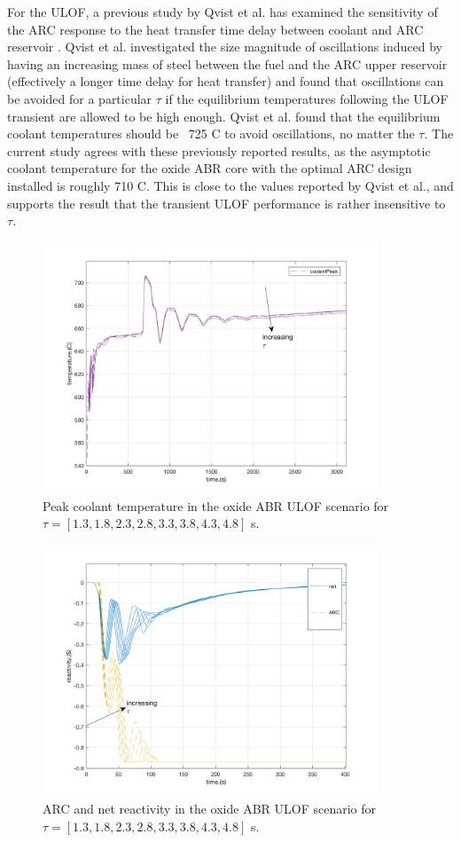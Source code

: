 \documentclass[11pt, oneside]{article}   	%
\begin{document}
For the ULOF, a previous study by Qvist et al. has examined the sensitivity of the ARC response to the heat transfer time delay between coolant and ARC reservoir \cite{ARC_Annals}.
Qvist et al. investigated the size magnitude of oscillations induced by having an increasing mass of steel between the fuel and the ARC upper reservoir (effectively a longer time delay for heat transfer) and found that oscillations can be avoided for a particular $\tau$ if the equilibrium temperatures following the ULOF transient are allowed to be high enough.
Qvist et al. found that the equilibrium coolant temperatures should be ~725 C to avoid oscillations, no matter the $\tau$.
The current study agrees with these previously reported results, as the asymptotic coolant temperature for the oxide ABR core with the optimal ARC design installed is roughly 710 C. 
This is close to the values reported by Qvist et al., and supports the result that the transient ULOF performance is rather insensitive to $\tau$.

\begin{figure}[h!]
\includegraphics[width=10cm]{ULOF_peak}
\centering
\caption{Peak coolant temperature in the oxide ABR ULOF scenario for $\tau=[1.3, 1.8, 2.3, 2.8, 3.3, 3.8, 4.3, 4.8]$ s.}
\label{fig:ULOF_peak}
\end{figure}

\begin{figure}[h!]
\includegraphics[width=10cm]{ULOF_rho}
\centering
\caption{ARC and net reactivity in the oxide ABR ULOF scenario for $\tau=[1.3, 1.8, 2.3, 2.8, 3.3, 3.8, 4.3, 4.8]$ s.}
\label{fig:ULOF_rho}
\end{figure}
\end{document}

